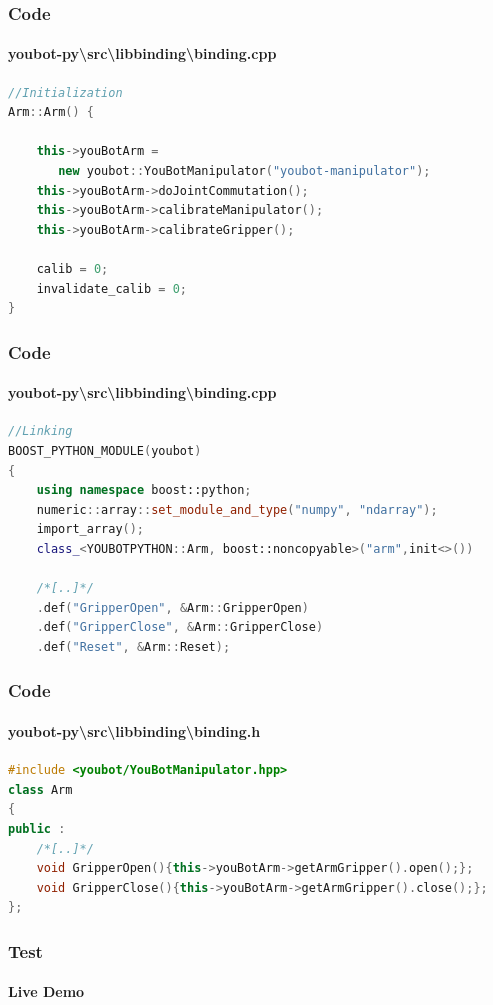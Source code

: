 \documentclass{beamer}
\begin{document}
\begin{frame}[fragile]
 \frametitle{Code}
 \framesubtitle{youbot-py\textbackslash src\textbackslash libbinding\textbackslash binding.cpp}
\begin{lstlisting}[language=C++]
//Initialization
Arm::Arm() {

	this->youBotArm =
	   new youbot::YouBotManipulator("youbot-manipulator");
	this->youBotArm->doJointCommutation();
	this->youBotArm->calibrateManipulator();
	this->youBotArm->calibrateGripper();

	calib = 0;
	invalidate_calib = 0;
}
 \end{lstlisting}
\end{frame}

\begin{frame}[fragile]
 \frametitle{Code}
 \framesubtitle{youbot-py\textbackslash src\textbackslash libbinding\textbackslash binding.cpp}
\begin{lstlisting}[language=C++]
//Linking
BOOST_PYTHON_MODULE(youbot)
{
    using namespace boost::python;
    numeric::array::set_module_and_type("numpy", "ndarray"); 
    import_array();
    class_<YOUBOTPYTHON::Arm, boost::noncopyable>("arm",init<>())

	/*[..]*/
	.def("GripperOpen", &Arm::GripperOpen)
	.def("GripperClose", &Arm::GripperClose)
	.def("Reset", &Arm::Reset);
\end{lstlisting}
\end{frame}

\begin{frame}[fragile]
 \frametitle{Code}
 \framesubtitle{youbot-py\textbackslash src\textbackslash libbinding\textbackslash binding.h}
\begin{lstlisting}[language=C++]
#include <youbot/YouBotManipulator.hpp>
class Arm
{
public :
	/*[..]*/
	void GripperOpen(){this->youBotArm->getArmGripper().open();};
	void GripperClose(){this->youBotArm->getArmGripper().close();};
};
\end{lstlisting}
\end{frame}


\begin{frame}
 \frametitle{Test}
 \framesubtitle{Live Demo}
\end{frame}


%         


\end{document}
